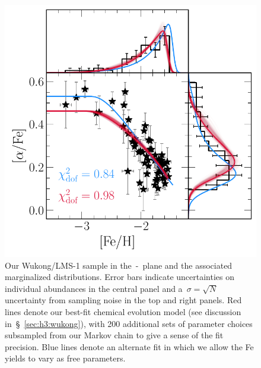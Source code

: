 \documentclass[ms.tex]{subfiles}
\begin{document}
\begin{figure}
\centering
\includegraphics[scale = 0.65]{wukong_bestfit.pdf}
\caption{
Our Wukong/LMS-1 sample in the~\afe-\feh~plane and the associated marginalized
distributions.
Error bars indicate uncertainties on individual abundances in the central panel
and a~$\sigma = \sqrt{N}$ uncertainty from sampling noise in the top and right
panels.
Red lines denote our best-fit chemical evolution model (see discussion
in~\S~\ref{sec:h3:wukong}), with 200 additional sets of parameter choices
subsampled from our Markov chain to give a sense of the fit precision.
Blue lines denote an alternate fit in which we allow the Fe yields to vary as
free parameters.
}
\label{fig:wukong}
\end{figure}
\end{document}
